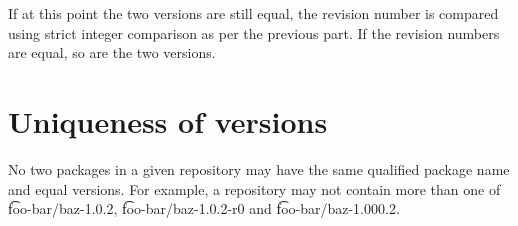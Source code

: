 If at this point the two versions are still equal, the revision number is compared using strict
integer comparison as per the previous part. If the revision numbers are equal, so are the two
versions.

\section{Uniqueness of versions}

No two packages in a given repository may have the same qualified package name and equal versions.
For example, a repository may not contain more than one of \t{foo-bar/baz-1.0.2},
\t{foo-bar/baz-1.0.2-r0} and \t{foo-bar/baz-1.000.2}.


